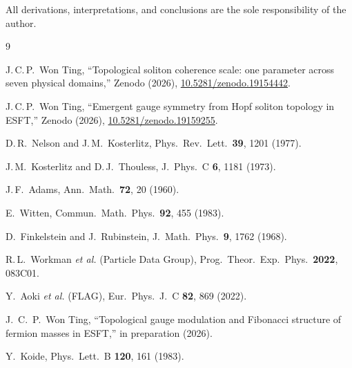 ﻿\documentclass[aps,prl,twocolumn,superscriptaddress,showpacs]{revtex4-2}
\begin{document}
\begin{acknowledgments}
All derivations, interpretations, and conclusions
are the sole responsibility of the author.
\end{acknowledgments}

\begin{thebibliography}{9}

 J.\,C.\,P.\ Won Ting,
 ``Topological soliton coherence scale: one parameter across seven
 physical domains,''
 Zenodo (2026), \href{https://doi.org/10.5281/zenodo.19154442}{10.5281/zenodo.19154442}.

 J.\,C.\,P.\ Won Ting,
 ``Emergent gauge symmetry from Hopf soliton topology in ESFT,''
 Zenodo (2026), \href{https://doi.org/10.5281/zenodo.19159255}{10.5281/zenodo.19159255}.

 D.\,R.\ Nelson and J.\,M.\ Kosterlitz,
 Phys.\ Rev.\ Lett.\ \textbf{39}, 1201 (1977).

 J.\,M.\ Kosterlitz and D.\,J.\ Thouless,
 J.\ Phys.\ C \textbf{6}, 1181 (1973).

 J.\,F.\ Adams,
 Ann.\ Math.\ \textbf{72}, 20 (1960).

 E.\ Witten,
 Commun.\ Math.\ Phys.\ \textbf{92}, 455 (1983).

 D.\ Finkelstein and J.\ Rubinstein,
 J.\ Math.\ Phys.\ \textbf{9}, 1762 (1968).

 R.\,L.\ Workman \textit{et al.} (Particle Data Group),
 Prog.\ Theor.\ Exp.\ Phys.\ \textbf{2022}, 083C01.

 Y.\ Aoki \textit{et al.} (FLAG),
 Eur.\ Phys.\ J.\ C \textbf{82}, 869 (2022).

 J.~C.~P.~Won Ting,
 ``Topological gauge modulation and Fibonacci structure of fermion
 masses in ESFT,''
 in preparation (2026).

 Y.\ Koide,
 Phys.\ Lett.\ B \textbf{120}, 161 (1983).

\end{thebibliography}
\end{document}
